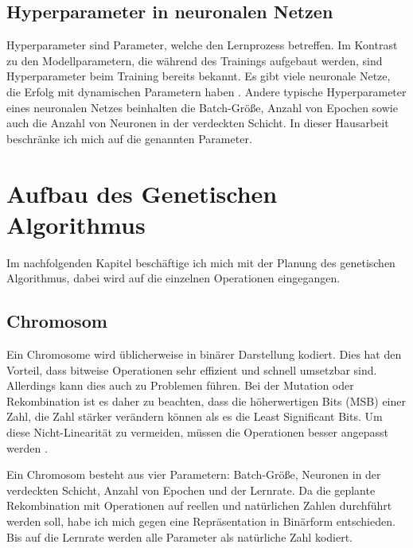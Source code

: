 \subsection{Hyperparameter in neuronalen Netzen}
Hyperparameter sind Parameter, welche den Lernprozess betreffen. Im Kontrast zu den Modellparametern, die während des Trainings aufgebaut werden, sind Hyperparameter beim Training bereits bekannt. Es gibt viele neuronale Netze, die Erfolg mit dynamischen Parametern haben \parencite{schaul_no_2013}. Andere typische Hyperparameter eines neuronalen Netzes beinhalten die Batch-Größe, Anzahl von Epochen sowie auch die Anzahl von Neuronen in der verdeckten Schicht. In dieser Hausarbeit beschränke ich mich auf die genannten Parameter.
\section{Aufbau des Genetischen Algorithmus}
Im nachfolgenden Kapitel beschäftige ich mich mit der Planung des genetischen Algorithmus, dabei wird auf die einzelnen Operationen eingegangen.
\subsection{Chromosom}
Ein Chromosome wird üblicherweise in binärer Darstellung kodiert. Dies hat den Vorteil, dass bitweise Operationen sehr effizient und schnell umsetzbar sind. Allerdings kann dies auch zu Problemen führen. Bei der Mutation oder Rekombination ist es daher zu beachten, dass die höherwertigen Bits (MSB) einer Zahl, die Zahl stärker verändern können als es die Least Significant Bits. Um diese Nicht-Linearität zu vermeiden, müssen die Operationen besser angepasst werden \parencite{herrera_tackling_1998}.  

Ein Chromosom besteht aus vier Parametern: Batch-Größe,  Neuronen in der verdeckten Schicht, Anzahl von Epochen und der Lernrate. Da die geplante Rekombination mit Operationen auf reellen und natürlichen Zahlen durchführt werden soll, habe ich mich gegen eine Repräsentation in Binärform entschieden. Bis auf die Lernrate werden alle Parameter als natürliche Zahl kodiert.
